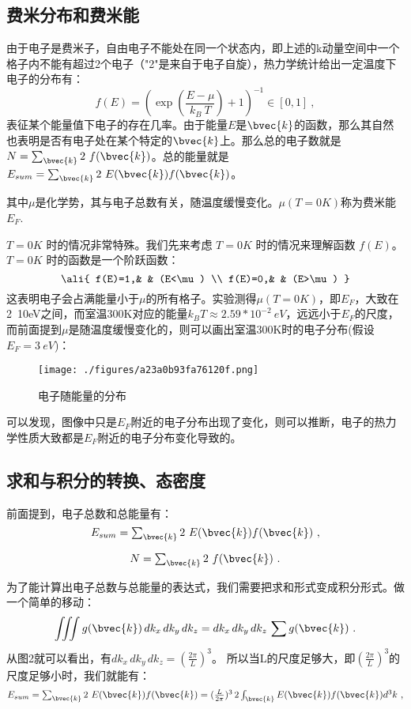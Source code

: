 \subsection{费米分布和费米能}
由于电子是费米子，自由电子不能处在同一个状态内，即上述的k动量空间中一个格子内不能有超过2个电子（"2"是来自于电子自旋），热力学统计给出一定温度下电子的分布有：
\begin{equation}
f(E)=\left (\exp(\frac{E-\mu}{k_B\ T})+1\right )^{-1}    \in[0,1]~,
\end{equation}
表征某个能量值下电子的存在几率。由于能量$E$是$\bvec{k}$的函数，那么其自然也表明是否有电子处在某个特定的$\bvec{k}$上。那么总的电子数就是$N=\textstyle \sum_{\bvec{k}}2\ f(\bvec{k})$。总的能量就是$E_{sum}=\textstyle \sum_{\bvec{k}}2\ E(\bvec{k})f(\bvec{k})$。

其中$\mu$是化学势，其与电子总数有关，随温度缓慢变化。$\mu (T=0K)$称为费米能$E_F$.

$T=0K$ 时的情况非常特殊。我们先来考虑 $T=0K$ 时的情况来理解函数 $f(E)$。$T=0K$ 时的函数是一个阶跃函数：
\begin{equation}\ali{
f(E)=1,& & (E<\mu) \\
f(E)=0,& & (E>\mu)
}\end{equation}
这表明电子会占满能量小于$\mu$的所有格子。实验测得$\mu(T=0K)$，即$E_F$，大致在2~10eV之间，而室温300K对应的能量$k_BT\approx2.59*10^{-2}\ eV$，远远小于$E_F$的尺度，而前面提到$\mu$是随温度缓慢变化的，则可以画出室温300K时的电子分布(假设$E_F=3\ eV$)：
\begin{figure}[ht]
\centering
\texttt{[image: ./figures/a23a0b93fa76120f.png]}
\caption{电子随能量的分布} \label{fig_SMFM_3}
\end{figure}
可以发现，图像中只是$E_F$附近的电子分布出现了变化，则可以推断，电子的热力学性质大致都是$E_F$附近的电子分布变化导致的。

\subsection{求和与积分的转换、态密度}
前面提到，电子总数和总能量有：
\begin{equation}
E_{sum}=\textstyle \sum_{\bvec{k}}2\ E(\bvec{k})f(\bvec{k})~,
\end{equation}

\begin{equation}
N=\textstyle \sum_{\bvec{k}}2\ f(\bvec{k})~.
\end{equation}

为了能计算出电子总数与总能量的表达式，我们需要把求和形式变成积分形式。做一个简单的移动：
\begin{equation}
\iiint g(\bvec{k})\,dk_x\,dk_y\,dk_z=dk_x\,dk_y\,dk_z\,\sum g(\bvec{k})~.
\end{equation}
从图2就可以看出，有$dk_x\,dk_y\,dk_z=(\frac{2\pi}{L})^3$。
所以当L的尺度足够大，即$(\frac{2\pi}{L})^3$的尺度足够小时，我们就能有：
\begin{equation}
E_{sum}=\textstyle \sum_{\bvec{k}}2\ E(\bvec{k})f(\bvec{k})=(\frac{L}{2\pi})^3\,2 \int_{\bvec{k}}E(\bvec{k})f(\bvec{k})d^3k~,
\end{equation}

